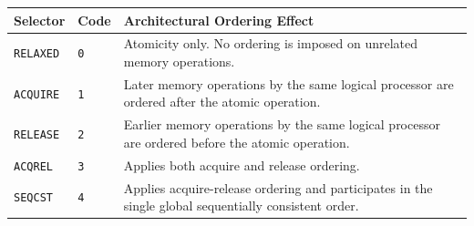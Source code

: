 \Needspace{1.25in}
\begingroup\footnotesize
\setlength{\aboverulesep}{0pt}
\setlength{\belowrulesep}{0pt}
\setlength{\extrarowheight}{1.2pt}
\begin{center}
\begin{tabularx}{\linewidth}{@{}>{\raggedright\arraybackslash}p{0.95in}>{\raggedright\arraybackslash}p{0.45in}>{\raggedright\arraybackslash}X@{}}
\toprule
\rowcolor{ManualHeaderFill}
\textbf{Selector} & \textbf{Code} & \textbf{Architectural Ordering Effect}\\
\midrule
\texttt{RELAXED} & \texttt{0} & Atomicity only. No ordering is imposed on unrelated memory operations.\\
\texttt{ACQUIRE} & \texttt{1} & Later memory operations by the same logical processor are ordered after the atomic operation.\\
\texttt{RELEASE} & \texttt{2} & Earlier memory operations by the same logical processor are ordered before the atomic operation.\\
\texttt{ACQREL} & \texttt{3} & Applies both acquire and release ordering.\\
\texttt{SEQCST} & \texttt{4} & Applies acquire-release ordering and participates in the single global sequentially consistent order.\\
\bottomrule
\end{tabularx}
\end{center}
\endgroup
